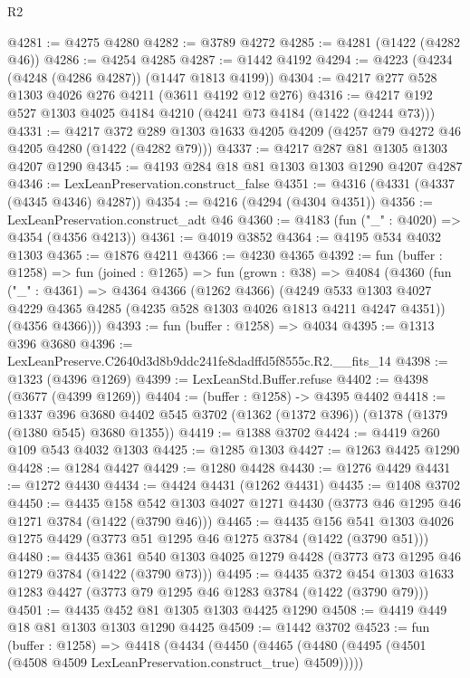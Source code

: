 \begin{lexlean}{R2}
\begin{coremodule}
@4281 := @4275 @4280
@4282 := @3789 @4272
@4285 := @4281 (@1422 (@4282 @46))
@4286 := @4254 @4285
@4287 := @1442 @4192
@4294 := @4223 (@4234 (@4248 (@4286 @4287)) (@1447 @1813 @4199))
@4304 := @4217 @277 @528 @1303 @4026 @276 @4211 (@3611 @4192 @12 @276)
@4316 := @4217 @192 @527 @1303 @4025 @4184 @4210 (@4241 @73 @4184 (@1422 (@4244 @73)))
@4331 := @4217
    @372
    @289
    @1303
    @1633
    @4205
    @4209
    (@4257 @79 @4272 @46 @4205 @4280 (@1422 (@4282 @79)))
@4337 := @4217 @287 @81 @1305 @1303 @4207 @1290
@4345 := @4193 @284 @18 @81 @1303 @1303 @1290 @4207 @4287
@4346 := LexLeanPreservation.construct_false
@4351 := @4316 (@4331 (@4337 (@4345 @4346) @4287))
@4354 := @4216 (@4294 (@4304 @4351))
@4356 := LexLeanPreservation.construct_adt @46
@4360 := @4183 (fun ("_" : @4020) => @4354 (@4356 @4213))
@4361 := @4019 @3852
@4364 := @4195 @534 @4032 @1303
@4365 := @1876 @4211
@4366 := @4230 @4365
@4392 := fun (buffer : @1258) =>
  fun (joined : @1265) =>
  fun (grown : @38) =>
  @4084
    (@4360
      (fun ("_" : @4361) =>
      @4364
        @4366
        (@1262 @4366)
        (@4249 @533 @1303 @4027 @4229 @4365 @4285 (@4235 @528 @1303 @4026 @1813 @4211 @4247 @4351))
        (@4356 @4366)))
@4393 := fun (buffer : @1258) => @4034
@4395 := @1313 @396 @3680
@4396 := LexLeanPreserve.C2640d3d8b9ddc241fe8dadffd5f8555c.R2.__fits_14
@4398 := @1323 (@4396 @1269)
@4399 := LexLeanStd.Buffer.refuse
@4402 := @4398 (@3677 (@4399 @1269))
@4404 := (buffer : @1258) -> @4395 @4402
@4418 := @1337
    @396
    @3680
    @4402
    @545
    @3702
    (@1362 (@1372 @396))
    (@1378 (@1379 (@1380 @545) @3680 @1355))
@4419 := @1388 @3702
@4424 := @4419 @260 @109 @543 @4032 @1303
@4425 := @1285 @1303
@4427 := @1263 @4425 @1290
@4428 := @1284 @4427
@4429 := @1280 @4428
@4430 := @1276 @4429
@4431 := @1272 @4430
@4434 := @4424 @4431 (@1262 @4431)
@4435 := @1408 @3702
@4450 := @4435
    @158
    @542
    @1303
    @4027
    @1271
    @4430
    (@3773 @46 @1295 @46 @1271 @3784 (@1422 (@3790 @46)))
@4465 := @4435
    @156
    @541
    @1303
    @4026
    @1275
    @4429
    (@3773 @51 @1295 @46 @1275 @3784 (@1422 (@3790 @51)))
@4480 := @4435
    @361
    @540
    @1303
    @4025
    @1279
    @4428
    (@3773 @73 @1295 @46 @1279 @3784 (@1422 (@3790 @73)))
@4495 := @4435
    @372
    @454
    @1303
    @1633
    @1283
    @4427
    (@3773 @79 @1295 @46 @1283 @3784 (@1422 (@3790 @79)))
@4501 := @4435 @452 @81 @1305 @1303 @4425 @1290
@4508 := @4419 @449 @18 @81 @1303 @1303 @1290 @4425
@4509 := @1442 @3702
@4523 := fun (buffer : @1258) =>
  @4418
    (@4434
      (@4450 (@4465 (@4480 (@4495 (@4501 (@4508 @4509 LexLeanPreservation.construct_true) @4509)))))

\end{coremodule}
\end{lexlean}
